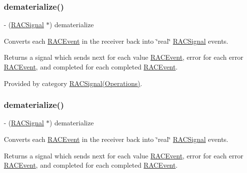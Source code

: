 \subsubsection{\texorpdfstring{dematerialize()}{dematerialize()}\hspace{0.1cm}{\footnotesize\ttfamily [2/3]}}
{\footnotesize\ttfamily -\/ (\mbox{\hyperlink{interface_r_a_c_signal}{R\+A\+C\+Signal}} $\ast$) dematerialize \begin{DoxyParamCaption}{ }\end{DoxyParamCaption}}

Converts each \mbox{\hyperlink{interface_r_a_c_event}{R\+A\+C\+Event}} in the receiver back into \char`\"{}real\char`\"{} \mbox{\hyperlink{interface_r_a_c_signal}{R\+A\+C\+Signal}} events.

Returns a signal which sends {\ttfamily next} for each value \mbox{\hyperlink{interface_r_a_c_event}{R\+A\+C\+Event}}, {\ttfamily error} for each error \mbox{\hyperlink{interface_r_a_c_event}{R\+A\+C\+Event}}, and {\ttfamily completed} for each completed \mbox{\hyperlink{interface_r_a_c_event}{R\+A\+C\+Event}}. 

Provided by category \mbox{\hyperlink{category_r_a_c_signal_07_operations_08_aa5b197f63d89c698c8cbfc749ea15440}{R\+A\+C\+Signal(\+Operations)}}.

\mbox{\label{interface_r_a_c_signal_aa5b197f63d89c698c8cbfc749ea15440}} 
\subsubsection{\texorpdfstring{dematerialize()}{dematerialize()}\hspace{0.1cm}{\footnotesize\ttfamily [3/3]}}
{\footnotesize\ttfamily -\/ (\mbox{\hyperlink{interface_r_a_c_signal}{R\+A\+C\+Signal}} $\ast$) dematerialize \begin{DoxyParamCaption}{ }\end{DoxyParamCaption}}

Converts each \mbox{\hyperlink{interface_r_a_c_event}{R\+A\+C\+Event}} in the receiver back into \char`\"{}real\char`\"{} \mbox{\hyperlink{interface_r_a_c_signal}{R\+A\+C\+Signal}} events.

Returns a signal which sends {\ttfamily next} for each value \mbox{\hyperlink{interface_r_a_c_event}{R\+A\+C\+Event}}, {\ttfamily error} for each error \mbox{\hyperlink{interface_r_a_c_event}{R\+A\+C\+Event}}, and {\ttfamily completed} for each completed \mbox{\hyperlink{interface_r_a_c_event}{R\+A\+C\+Event}}. 

